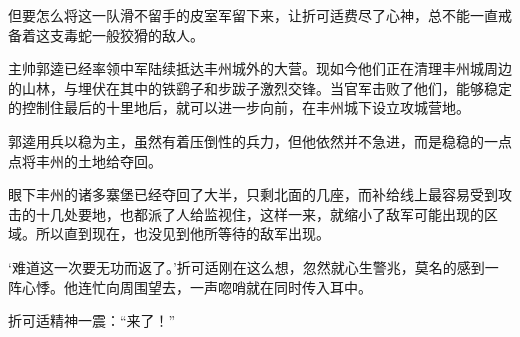 但要怎么将这一队滑不留手的皮室军留下来，让折可适费尽了心神，总不能一直戒备着这支毒蛇一般狡猾的敌人。

主帅郭逵已经率领中军陆续抵达丰州城外的大营。现如今他们正在清理丰州城周边的山林，与埋伏在其中的铁鹞子和步跋子激烈交锋。当官军击败了他们，能够稳定的控制住最后的十里地后，就可以进一步向前，在丰州城下设立攻城营地。

郭逵用兵以稳为主，虽然有着压倒性的兵力，但他依然并不急进，而是稳稳的一点点将丰州的土地给夺回。

眼下丰州的诸多寨堡已经夺回了大半，只剩北面的几座，而补给线上最容易受到攻击的十几处要地，也都派了人给监视住，这样一来，就缩小了敌军可能出现的区域。所以直到现在，也没见到他所等待的敌军出现。

‘难道这一次要无功而返了。’折可适刚在这么想，忽然就心生警兆，莫名的感到一阵心悸。他连忙向周围望去，一声唿哨就在同时传入耳中。

折可适精神一震：“来了！”

